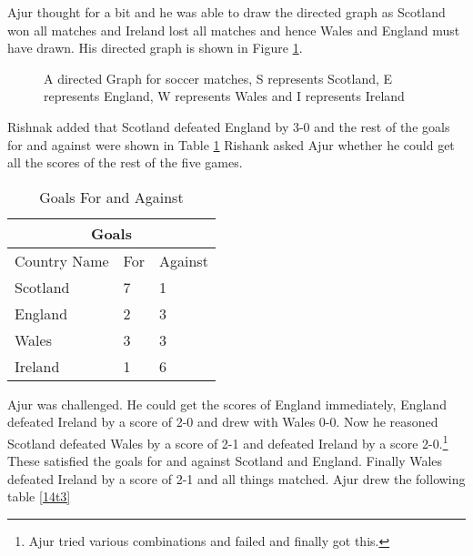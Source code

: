 Ajur thought for a bit and he was able to draw the directed graph as Scotland won all matches and Ireland lost all matches and hence Wales and England must have drawn. His directed graph is shown in Figure \ref{15g33}.

\begin{figure}
\begin{center}
\caption{ A directed Graph for soccer matches, S represents Scotland, E represents England, W represents Wales and I represents Ireland}\label{15g33}
\end{center}
\end{figure}

Rishnak added that Scotland defeated England by 3-0 and the rest of the goals for and against were
shown in Table \ref{14t2} Rishank asked Ajur whether he could get all the scores of the rest of the five games.
\begin{table}
\begin{center}
\begin{tabular}{ |p{3cm}||p{1.5cm}||p{1.5cm} || }
 \hline
 \multicolumn{3}{|c|}{Goals} \\
 \hline
 Country Name & For&Against\\
 \hline
 Scotland  & 7    &1\\
 England& 2&3\\
 Wales&3&3\\
 Ireland&1&6\\
 
 \hline
\end{tabular}
\caption{Goals For and Against}\label{14t2}
\end{center}
\end{table}

Ajur was challenged. He could get the scores of England immediately, England defeated Ireland by a score of 2-0 and drew with Wales 0-0. Now he reasoned Scotland defeated Wales by a score of 2-1 and defeated Ireland by a score 2-0.\footnote{Ajur tried various combinations and failed and finally got this.} These
satisfied the goals for and against Scotland and England. Finally Wales defeated Ireland by a score of 2-1
and all things matched.
Ajur drew the following table \ref{14t3}

